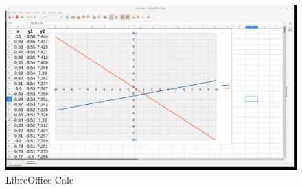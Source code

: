 \begin{figure}[h!]		
	\centering
   	\includegraphics[width=8.0in]{pictures/picture_030.png}
  	\caption{LibreOffice Calc}
   	\label{fig:LibreOfficeCalc030}
\end{figure}